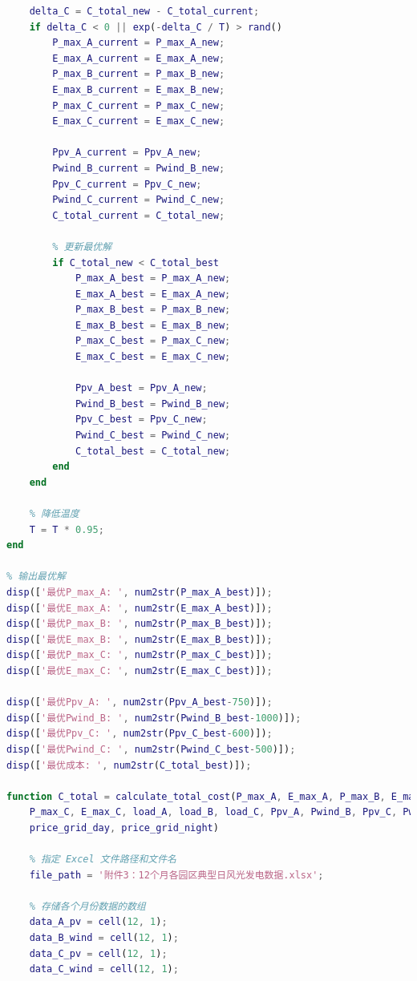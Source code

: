 \documentclass{cumcmthesis}
\begin{document}
\begin{appendices}
\begin{lstlisting}[language=Matlab]
    % 判断是否接受新解
    delta_C = C_total_new - C_total_current;
    if delta_C < 0 || exp(-delta_C / T) > rand()
        P_max_A_current = P_max_A_new;
        E_max_A_current = E_max_A_new;
        P_max_B_current = P_max_B_new;
        E_max_B_current = E_max_B_new;
        P_max_C_current = P_max_C_new;
        E_max_C_current = E_max_C_new;

        Ppv_A_current = Ppv_A_new;
        Pwind_B_current = Pwind_B_new;
        Ppv_C_current = Ppv_C_new;
        Pwind_C_current = Pwind_C_new;
        C_total_current = C_total_new;

        % 更新最优解
        if C_total_new < C_total_best
            P_max_A_best = P_max_A_new;
            E_max_A_best = E_max_A_new;
            P_max_B_best = P_max_B_new;
            E_max_B_best = E_max_B_new;
            P_max_C_best = P_max_C_new;
            E_max_C_best = E_max_C_new;

            Ppv_A_best = Ppv_A_new;
            Pwind_B_best = Pwind_B_new;
            Ppv_C_best = Ppv_C_new;
            Pwind_C_best = Pwind_C_new;
            C_total_best = C_total_new;
        end
    end

    % 降低温度
    T = T * 0.95;
end

% 输出最优解
disp(['最优P_max_A: ', num2str(P_max_A_best)]);
disp(['最优E_max_A: ', num2str(E_max_A_best)]);
disp(['最优P_max_B: ', num2str(P_max_B_best)]);
disp(['最优E_max_B: ', num2str(E_max_B_best)]);
disp(['最优P_max_C: ', num2str(P_max_C_best)]);
disp(['最优E_max_C: ', num2str(E_max_C_best)]);

disp(['最优Ppv_A: ', num2str(Ppv_A_best-750)]);
disp(['最优Pwind_B: ', num2str(Pwind_B_best-1000)]);
disp(['最优Ppv_C: ', num2str(Ppv_C_best-600)]);
disp(['最优Pwind_C: ', num2str(Pwind_C_best-500)]);
disp(['最优成本: ', num2str(C_total_best)]);

function C_total = calculate_total_cost(P_max_A, E_max_A, P_max_B, E_max_B, ...
    P_max_C, E_max_C, load_A, load_B, load_C, Ppv_A, Pwind_B, Ppv_C, Pwind_C, ...
    price_grid_day, price_grid_night)

    % 指定 Excel 文件路径和文件名
    file_path = '附件3：12个月各园区典型日风光发电数据.xlsx';

    % 存储各个月份数据的数组
    data_A_pv = cell(12, 1);
    data_B_wind = cell(12, 1);
    data_C_pv = cell(12, 1);
    data_C_wind = cell(12, 1);


\end{lstlisting}
\end{appendices}
\end{document}
